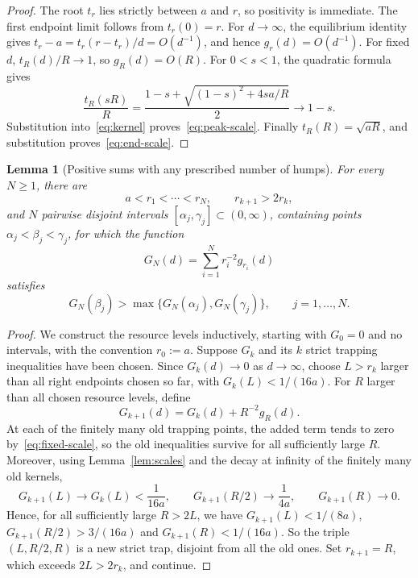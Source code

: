 \documentclass[11pt]{article}
\newtheorem{lemma}[theorem]{Lemma}
\theoremstyle{remark}
\begin{document}
\begin{proof}
The root \(t_r\) lies strictly between \(a\) and \(r\), so positivity
is immediate. The first endpoint limit follows from \(t_r(0)=r\).
For \(d\to\infty\), the equilibrium identity gives
\(t_r-a=t_r(r-t_r)/d=O(d^{-1})\), and hence \(g_r(d)=O(d^{-1})\).
For fixed \(d\), \(t_R(d)/R\to1\), so \(g_R(d)=O(R)\).
For \(0<s<1\), the quadratic formula gives
\[
 \frac{t_R(sR)}R
   =\frac{1-s+\sqrt{(1-s)^2+4sa/R}}2\longrightarrow1-s.
\]
Substitution into~\eqref{eq:kernel} proves~\eqref{eq:peak-scale}.
Finally \(t_R(R)=\sqrt{aR}\), and substitution proves~\eqref{eq:end-scale}.
\end{proof}

\begin{lemma}[Positive sums with any prescribed number of humps]
\label{lem:many-kernels}
For every \(N\geq1\), there are
\[
 a<r_1<\cdots<r_N,\qquad r_{k+1}>2r_k,
\]
and \(N\) pairwise disjoint intervals
\([\alpha_j,\gamma_j]\subset(0,\infty)\), containing points
\(\alpha_j<\beta_j<\gamma_j\), for which the function
\begin{equation}\label{eq:G}
 G_N(d)=\sum_{i=1}^N r_i^{-2}g_{r_i}(d)
\end{equation}
satisfies
\begin{equation}\label{eq:traps}
 G_N(\beta_j)>
       \max\{G_N(\alpha_j),G_N(\gamma_j)\},
 \qquad j=1,\ldots,N.
\end{equation}
\end{lemma}

\begin{proof}
We construct the resource levels inductively, starting with \(G_0=0\)
and no intervals, with the convention \(r_0:=a\). Suppose \(G_k\) and its \(k\) strict trapping
inequalities have been chosen. Since \(G_k(d)\to0\) as
\(d\to\infty\), choose \(L>r_k\) larger than all right endpoints chosen
so far, with \(G_k(L)<1/(16a)\). For \(R\) larger than all chosen resource
levels, define
\[
 G_{k+1}(d)=G_k(d)+R^{-2}g_R(d).
\]
At each of the finitely many old trapping points, the added term
tends to zero by~\eqref{eq:fixed-scale}, so the old inequalities
survive for all sufficiently large \(R\). Moreover, using
Lemma~\ref{lem:scales} and the decay at infinity of the finitely many old
kernels,
\[
 G_{k+1}(L)\longrightarrow G_k(L)<\frac1{16a},\qquad
 G_{k+1}(R/2)\longrightarrow\frac1{4a},\qquad
 G_{k+1}(R)\longrightarrow0 .
\]
Hence, for all sufficiently large \(R>2L\), we have
\(G_{k+1}(L)<1/(8a)\), \(G_{k+1}(R/2)>3/(16a)\) and
\(G_{k+1}(R)<1/(16a)\). So the triple \((L,R/2,R)\) is a new strict trap,
disjoint from all the old ones. Set \(r_{k+1}=R\), which exceeds
\(2L>2r_k\), and continue.
\end{proof}
\end{document}
